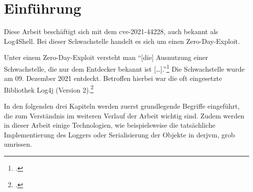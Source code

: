 
\section{Einführung}\label{sec:einfuhrung}
Diese Arbeit beschäftigt sich mit dem \gls{cve}-2021-44228, auch bekannt als Log4Shell.
Bei dieser Schwachstelle handelt es sich um einen Zero-Day-Exploit.

Unter einem Zero-Day-Exploit versteht man ``[die] Ausnutzung einer Schwachstelle, die nur dem Entdecker bekannt ist [\ldots].''\footcite{bsizeroday}
Die Schwachstelle wurde am 09. Dezember 2021 entdeckt.
Betroffen hierbei war die oft eingesetzte Bibliothek Log4j (Version 2).\footcite{lunasec}

In den folgenden drei Kapiteln werden zuerst grundlegende Begriffe eingeführt, die zum Verständnis im weiteren Verlauf der Arbeit wichtig sind.
Zudem werden in dieser Arbeit einige Technologien, wie beispielsweise die tatsächliche Implementierung des Loggers oder Serialisierung der Objekte in der\gls{jvm}, grob umrissen.




